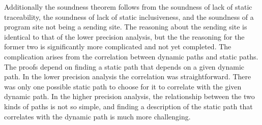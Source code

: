 \documentclass{article}
\begin{document}
Additionally the soundness theorem follows from the soundness of lack of static traceability,
the soundness of lack of static inclusiveness,
and the soundness of a program site not being a sending site. 
The reasoning about the sending site is identical to that of the lower precision analysis, but
the the reasoning for the former two is significantly more complicated and not yet completed.
The complication arises from the
correlation between dynamic paths and static paths.  The proofs depend on finding a static 
path that depends on a given dynamic path. In the lower precision analysis the
correlation was straightforward. There was only one possible static path to choose for it
to correlate with the given dynamic path. In the higher precision analysis, the relationship
between the two kinds of paths is not so simple, and finding a description of the static path
that correlates with the dynamic path is much more challenging.
\end{document}
